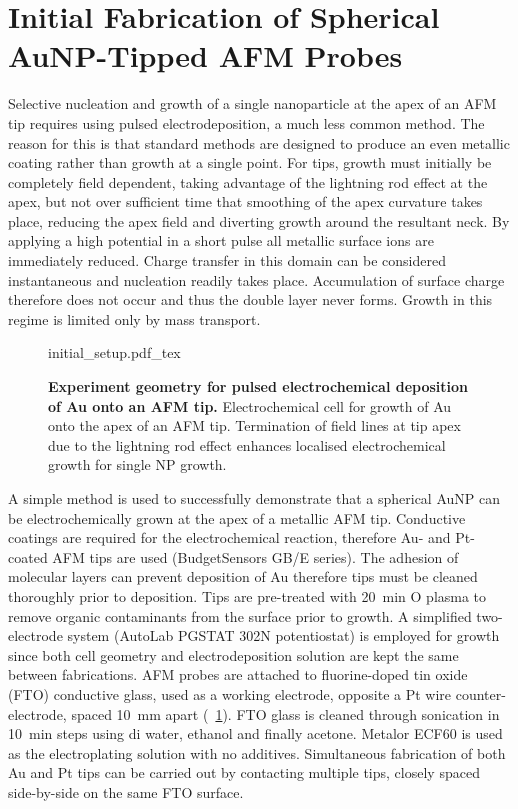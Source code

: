 \documentclass{article}
\begin{document}
\section{Initial Fabrication of Spherical AuNP-Tipped AFM Probes}
\label{sec:initial_fabrication}

Selective nucleation and growth of a single nanoparticle at the apex of an AFM tip requires using pulsed electrodeposition, a much less common method. The reason for this is that standard methods are designed to produce an even metallic coating rather than growth at a single point. For tips, growth must initially be completely field dependent, taking advantage of the lightning rod effect at the apex, but not over sufficient time that smoothing of the apex curvature takes place, reducing the apex field and diverting growth around the resultant neck. By applying a high potential in a short pulse all metallic surface ions are immediately reduced. Charge transfer in this domain can be considered instantaneous and nucleation readily takes place. Accumulation of surface charge therefore does not occur and thus the double layer never forms. Growth in this regime is limited only by mass transport.

\begin{figure}[bt]
\centering
{\fontsize{10pt}{1em}\selectfont \def\svgwidth{0.6\textwidth} {initial_setup.pdf_tex}}
\caption[Experiment geometry for pulsed electrochemical deposition of Au onto an AFM tip]{\textbf{Experiment geometry for pulsed electrochemical deposition of Au onto an AFM tip.} Electrochemical cell for growth of Au onto the apex of an AFM tip. Termination of field lines at tip apex due to the lightning rod effect enhances localised electrochemical growth for single NP growth.}
\label{fig:initial_setup}
\end{figure}

A simple method is used to successfully demonstrate that a spherical AuNP can be electrochemically grown at the apex of a metallic AFM tip. Conductive coatings are required for the electrochemical reaction, therefore Au- and Pt-coated AFM tips are used (BudgetSensors GB/E series). The adhesion of molecular layers can prevent deposition of Au therefore tips must be cleaned thoroughly prior to deposition. Tips are pre-treated with \SI{20}{\minute} O plasma to remove organic contaminants from the surface prior to growth. A simplified two-electrode system (AutoLab PGSTAT 302N potentiostat) is employed for growth since both cell geometry and electrodeposition solution are kept the same between fabrications. AFM probes are attached to fluorine-doped tin oxide (FTO) conductive glass, used as a working electrode, opposite a Pt wire counter-electrode, spaced \SI{10}{mm} apart (\figurename~\ref{fig:initial_setup}). FTO glass is cleaned through sonication in \SI{10}{\minute} steps using \gls{di} water, ethanol and finally acetone. Metalor ECF60 is used as the electroplating solution with no additives. Simultaneous fabrication of both Au and Pt tips can be carried out by contacting multiple tips, closely spaced side-by-side on the same FTO surface.
\end{document}
